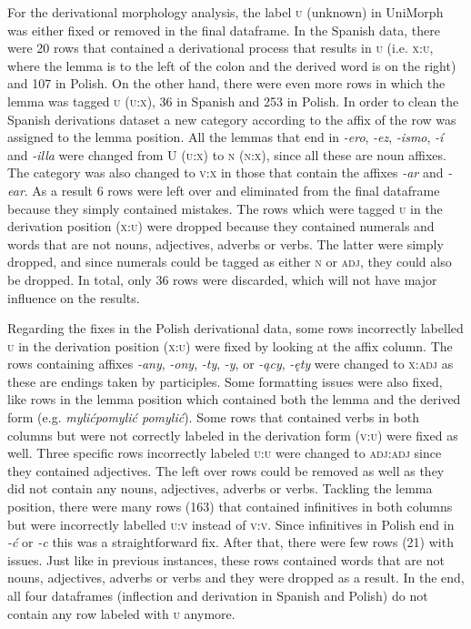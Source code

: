 \documentclass[12pt]{article}
\begin{document}
For the derivational morphology analysis, the label \textsc{u} (unknown) in UniMorph was either fixed or removed in the final dataframe. In the Spanish data, there were 20 rows that contained a derivational process that results in \textsc{u} (i.e. \textsc{x:u}, where the lemma is to the left of the colon and the derived word is on the right) and 107 in Polish. On the other hand, there were even more rows in which the lemma was tagged \textsc{u} (\textsc{u:x}), 36 in Spanish and 253 in Polish.
In order to clean the Spanish derivations dataset a new category according to the affix of the row was assigned to the lemma position. All the lemmas that end in \textit{-ero}, \textit{-ez}, \textit{-ismo}, \textit{-í} and \textit{-illa} were changed from \textsc{U} (\textsc{u:x}) to \textsc{n} (\textsc{n:x}), since all these are noun affixes. The category was also changed to \textsc{v:x} in those that contain the affixes \textit{-ar} and \textit{-ear}. As a result 6 rows were left over and eliminated from the final dataframe because they simply contained mistakes. The rows which were tagged \textsc{u} in the derivation position (\textsc{x:u}) were dropped because they contained numerals and words that are not nouns, adjectives, adverbs or verbs. The latter were simply dropped, and since numerals could be tagged as either \textsc{n} or \textsc{adj}, they could also be dropped. In total, only 36 rows were discarded, which will not have major influence on the results.

Regarding the fixes in the Polish derivational data, some rows incorrectly labelled \textsc{u} in the derivation position (\textsc{x:u}) were fixed by looking at the affix column. The rows containing affixes \textit{-any}, \textit{-ony}, \textit{-ty}, \textit{-y}, or \textit{-ący}, \textit{-ęty} were changed to \textsc{x:adj} as these are endings taken by participles. Some formatting issues were also fixed, like rows in the lemma position which contained both the lemma and the derived form (e.g. \textit{mylićpomylić pomylić}). Some rows that contained verbs in both columns but were not correctly labeled in the derivation form (\textsc{v:u}) were fixed as well. Three specific rows incorrectly labeled \textsc{u:u} were changed to \textsc{adj:adj} since they contained adjectives. The left over rows could be removed as well as they did not contain any nouns, adjectives, adverbs or verbs.
Tackling the lemma position, there were many rows (163) that contained infinitives in both columns but were incorrectly labelled \textsc{u:v} instead of \textsc{v:v}. Since infinitives in Polish end in \textit{-ć} or \textit{-c} this was a straightforward fix. After that, there were few rows (21) with issues. Just like in previous instances, these rows contained words that are not nouns, adjectives, adverbs or verbs and they were dropped as a result. In the end, all four dataframes (inflection and derivation in Spanish and Polish) do not contain any row labeled with \textsc{u} anymore.
\end{document}
